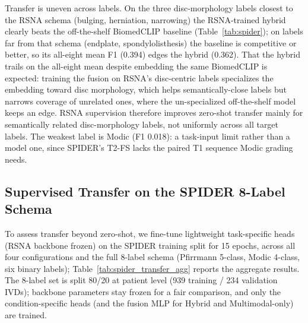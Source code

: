 \documentclass[runningheads]{llncs}
\begin{document}
Transfer is uneven across labels. On the three disc-morphology labels closest to the RSNA schema (bulging, herniation, narrowing) the RSNA-trained hybrid clearly beats the off-the-shelf BiomedCLIP baseline (Table~\ref{tab:spider}); on labels far from that schema (endplate, spondylolisthesis) the baseline is competitive or better, so its all-eight mean F1 (0.394) edges the hybrid (0.362). That the hybrid trails on the all-eight mean despite embedding the same BiomedCLIP is expected: training the fusion on RSNA's disc-centric labels specializes the embedding toward disc morphology, which helps semantically-close labels but narrows coverage of unrelated ones, where the un-specialized off-the-shelf model keeps an edge. RSNA supervision therefore improves zero-shot transfer mainly for semantically related disc-morphology labels, not uniformly across all target labels. The weakest label is Modic (F1 0.018): a task-input limit rather than a model one, since SPIDER's T2-FS lacks the paired T1 sequence Modic grading needs.

\subsection{Supervised Transfer on the SPIDER 8-Label Schema}
\label{sec:spider_transfer}

To assess transfer beyond zero-shot, we fine-tune lightweight task-specific heads (RSNA backbone frozen) on the SPIDER training split for 15 epochs, across all four configurations and the full 8-label schema (Pfirrmann 5-class, Modic 4-class, six binary labels); Table~\ref{tab:spider_transfer_agg} reports the aggregate results. The 8-label set is split 80/20 at patient level (939 training / 234 validation IVDs); backbone parameters stay frozen for a fair comparison, and only the condition-specific heads (and the fusion MLP for Hybrid and Multimodal-only) are trained.
\end{document}
